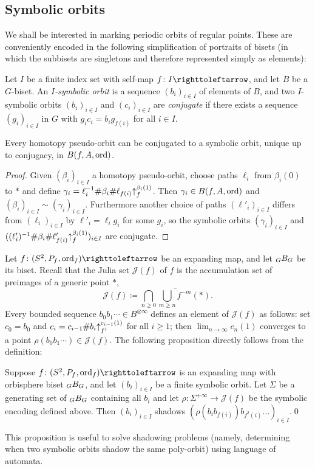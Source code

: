 \documentclass{amsart}
\newcommand\Julia{{\mathcal J}}
\begin{document}
\subsection{Symbolic orbits}
We shall be interested in marking periodic orbits of regular
points. These are conveniently encoded in the following simplification
of portraits of bisets (in which the subbisets are singletons and
therefore represented simply as elements):
\begin{defn}\label{def:symbolic}
  Let $I$ be a finite index set with self-map $f\colon I\selfmap$, and let
  $B$ be a $G$-biset. An \emph{$I$-symbolic orbit} is a sequence
  $(b_i)_{i\in I}$ of elements of $B$, and two $I$-symbolic orbits
  $(b_i)_{i\in I}$ and $(c_i)_{i\in I}$ are \emph{conjugate} if there
  exists a sequence $(g_i)_{i\in I}$ in $G$ with
  $g_i c_i=b_i g_{f(i)}$ for all $i\in I$.
\end{defn}

\begin{lem}
  Every homotopy pseudo-orbit can be conjugated to a symbolic orbit,
  unique up to conjugacy, in $B(f,A,\operatorname{ord})$.
\end{lem}
\begin{proof}
  Given $(\beta_i)_{i\in I}$ a homotopy pseudo-orbit, choose paths
  $\ell_i$ from $\beta_i(0)$ to $*$ and define
  $\gamma_i=\ell_i^{-1}\#\beta_i\#\ell_{f(i)}{\uparrow}_{f}^{\beta_i(1)}$. Then
  $\gamma_i\in B(f,A,\operatorname{ord})$ and
  $(\beta_i)_{i\in I}\sim(\gamma_i)_{i\in I}$. Furthermore another
  choice of paths $(\ell'_i)_{i\in I}$ differs from
  $(\ell_i)_{i\in I}$ by $\ell'_i=\ell_i g_i$ for some $g_i$, so the
  symbolic orbits $(\gamma_i)_{i\in I}$ and
  $((\ell'_i)^{-1}\#\beta_i\#\ell'_{f(i)}{\uparrow}_{f}^{\beta_i(1)})_{i\in I}$
  are conjugate.
\end{proof}

Let $f\colon(S^2,P_f,\ord_f)\selfmap$ be an expanding map, and let
$\subscript G B_G$ be its biset. Recall that the Julia set $\Julia(f)$
of $f$ is the accumulation set of preimages of a generic point $*$,
\[\Julia(f)\coloneqq\overline{\bigcap_{n\ge0}\bigcup_{m\ge n}f^{-m}(*)}.
\]
Every bounded sequence $b_0 b_1\cdots\in B^{\otimes\infty}$ defines an
element of $\Julia(f)$ as follows: set $c_0=b_0$ and
$c_i=c_{i-1}\#b_i{\uparrow}_{f^i}^{c_{i-1}(1)}$ for all $i\ge1$; then
$\lim_{n\to\infty}c_n(1)$ converges to a point
$\rho(b_0 b_1\cdots)\in\Julia(f)$. The following proposition directly
follows from the definition:
\begin{prop}\label{prop:ShadExpCase}
  Suppose $f\colon(S^2,P_f,\ord_f)\selfmap$ is an expanding map with
  orbisphere biset $\subscript G B_G$, and let $(b_i)_{i\in I}$ be a
  finite symbolic orbit. Let $\Sigma$ be a generating set of
  $\subscript G B_G$ containing all $b_i$ and let
  $\rho\colon\Sigma^{+\infty}\to\Julia(f)$ be the symbolic encoding
  defined above. Then $(b_i)_{i\in I}$ shadows
  $(\rho(b_i b_{f(i)}) b_{f^2(i)}\dots)_{i\in I}$.\qed
\end{prop}
This proposition is useful to solve shadowing problems (namely,
determining when two symbolic orbits shadow the same poly-orbit) using
language of automata.
\end{document}
